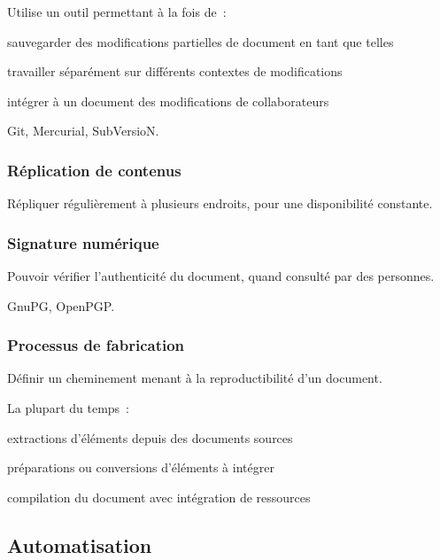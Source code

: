 Utilise un outil permettant à la fois de :
\begin{itmz}
\item{sauvegarder des modifications partielles de document en tant que telles}
\item{travailler séparément sur différents contextes de modifications}
\item{intégrer à un document des modifications de collaborateurs}
\end{itmz}

Git, Mercurial, SubVersioN.

\subsubsection{Réplication de contenus}

Répliquer régulièrement à plusieurs endroits, pour une disponibilité constante.

\subsubsection{Signature numérique}

Pouvoir vérifier l’authenticité du document, quand consulté par des personnes.

GnuPG, OpenPGP.

\subsubsection{Processus de fabrication}

Définir un cheminement menant à la reproductibilité d’un document.

La plupart du temps :
\begin{itmz}
\item{extractions d’éléments depuis des documents sources}
\item{préparations ou conversions d’éléments à intégrer}
\item{compilation du document avec intégration de ressources}
\item{}
\end{itmz}

\hr

\subsection{Automatisation}

